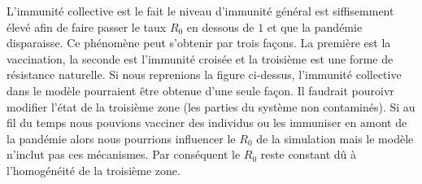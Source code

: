 L'immunité collective est le fait le niveau d'immunité général est siffisemment élevé afin de faire passer le taux $R_0$ en dessous de $1$ et que la pandémie disparaisse. Ce phénomène peut s'obtenir par trois façons. La première est la vaccination, la seconde est l'immunité croisée et la troisième est une forme de résistance naturelle. Si nous reprenions la figure ci-dessus, l'immunité collective dans le modèle pourraient être obtenue d'une seule façon. Il faudrait pouroivr modifier l'état de la troisième zone (les parties du système non contaminés). Si au fil du temps nous pouvions vacciner des individus ou les immuniser en amont de la pandémie alors nous pourrions influencer le $R_0$ de la simulation mais le modèle n'inclut pas ces mécanismes. Par conséquent le $R_0$ reste constant dû à l'homogénéité de la troisième zone.


